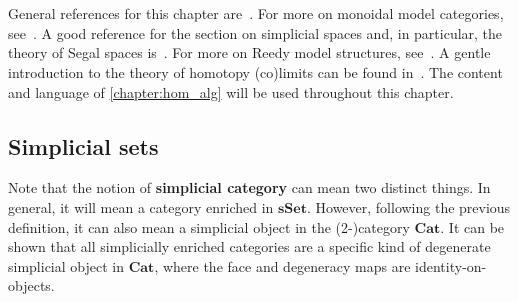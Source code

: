 \chapter{}\label{chapter:model_theory}

    General references for this chapter are~\citet{hovey_model_2007,riehl_homotopical_2019}. For more on monoidal model categories, see~\citet{riehl_monoidal_2013}. A good reference for the section on simplicial spaces and, in particular, the theory of Segal spaces is~\citet{rezk_model_2001}. For more on Reedy model structures, see~\citet{riehl_theory_2013}. A gentle introduction to the theory of homotopy (co)limits can be found in~\citet{riehl_homotopy_2011,lambrechts_gentle_2013}. The content and language of \cref{chapter:hom_alg} will be used throughout this chapter.

    \minitoc

\section{Simplicial sets}

    \begin{remark}
        Note that the notion of \textbf{simplicial category} can mean two distinct things. In general, it will mean a category enriched in $\mathbf{sSet}$. However, following the previous definition, it can also mean a simplicial object in the (2-)category $\mathbf{Cat}$. It can be shown that all simplicially enriched categories are a specific kind of degenerate simplicial object in $\mathbf{Cat}$, where the face and degeneracy maps are identity-on-objects.
    \end{remark}

